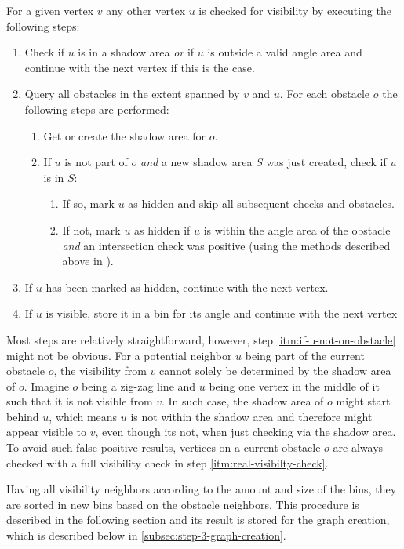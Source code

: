 				For a given vertex $v$ any other vertex $u$ is checked for visibility by executing the following steps:
				\begin{enumerate}
					\item Check if $u$ is in a shadow area \emph{or} if $u$ is outside a valid angle area and continue with the next vertex if this is the case.
					\item Query all obstacles in the extent spanned by $v$ and $u$. For each obstacle $o$ the following steps are performed:
					\begin{enumerate}
						\item Get or create the shadow area for $o$.
						\item If $u$ is not part of $o$ \emph{and} a new shadow area $S$ was just created, check if $u$ is in $S$:\label{itm:if-u-not-on-obstacle}
						\begin{enumerate}
							\item If so, mark $u$ as hidden and skip all subsequent checks and obstacles.
							\item If not, mark $u$ as hidden if $u$ is within the angle area of the obstacle \emph{and} an intersection check was positive (using the methods described above in \emph{}).\label{itm:real-visibilty-check}
						\end{enumerate}
					\end{enumerate}
					\item If $u$ has been marked as hidden, continue with the next vertex.
					\item If $u$ is visible, store it in a bin for its angle and continue with the next vertex
				\end{enumerate}
				Most steps are relatively straightforward, however, step \ref{itm:if-u-not-on-obstacle} might not be obvious.
				For a potential neighbor $u$ being part of the current obstacle $o$, the visibility from $v$ cannot solely be determined by the shadow area of $o$.
				Imagine $o$ being a zig-zag line and $u$ being one vertex in the middle of it such that it is not visible from $v$.
				In such case, the shadow area of $o$ might start behind $u$, which means $u$ is not within the shadow area and therefore might appear visible to $v$, even though its not, when just checking via the shadow area.
				To avoid such false positive results, vertices on a current obstacle $o$ are always checked with a full visibility check in step \ref{itm:real-visibilty-check}.
			
				Having all visibility neighbors according to the amount and size of the bins, they are sorted in new bins based on the obstacle neighbors.
				This procedure is described in the following section and its result is stored for the graph creation, which is described below in \cref{subsec:step-3-graph-creation}.
			
